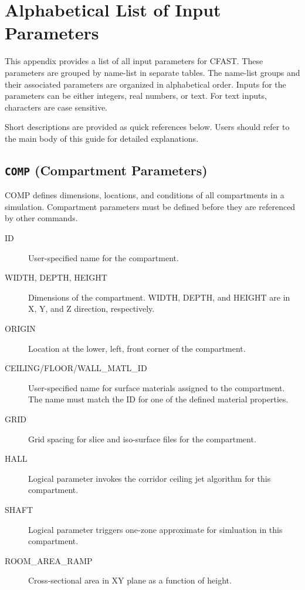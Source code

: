 \chapter{Alphabetical List of Input Parameters} \label{sec:CFAST_Keywords}


This appendix provides a list of all input parameters for CFAST. These parameters are grouped by name-list in separate tables. The name-list groups and their associated parameters are organized in alphabetical order. Inputs for the parameters can be either integers, real numbers, or text. For text inputs, characters are case sensitive. 

Short descriptions are provided as quick references below. Users should refer to the main body of this guide for detailed explanations.


\section{\texorpdfstring{{\tt COMP}}{COMP} (Compartment Parameters)}

COMP defines dimensions, locations, and conditions of all compartments in a simulation. Compartment parameters must be defined before they are referenced by other commands.

\begin{adjustwidth}{1cm}{0cm}
\begin{description}
  \item[ID] User-specified name for the compartment.
  \item[WIDTH, DEPTH, HEIGHT] Dimensions of the compartment. WIDTH, DEPTH, and HEIGHT are in X, Y, and Z direction, respectively.
  \item[ORIGIN] Location at the lower, left, front corner of the compartment.
  \item[CEILING/FLOOR/WALL\_MATL\_ID] User-specified name for surface materials assigned to the compartment. The name must match the ID for one of the defined material properties.
  \item[GRID] Grid spacing for slice and iso-surface files for the compartment.
  \item[HALL] Logical parameter invokes the corridor ceiling jet algorithm for this compartment.
  \item[SHAFT] Logical parameter triggers one-zone approximate for simluation in this compartment.
  \item[ROOM\_AREA\_RAMP] Cross-sectional area in XY plane as a function of height.
\end{description}
\end{adjustwidth}

